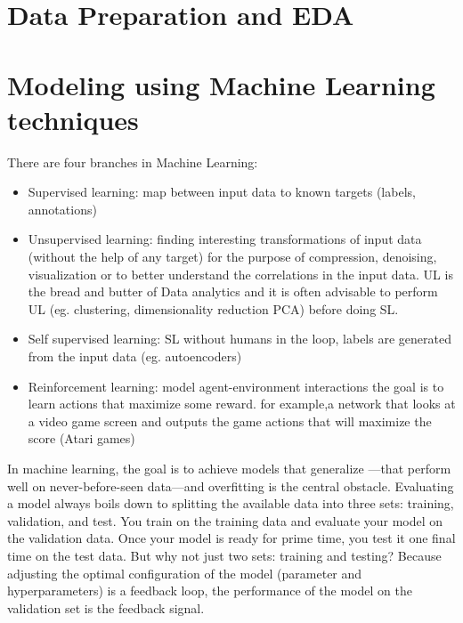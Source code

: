 \documentclass[11pt]{article}
\begin{document}
\section{Data Preparation and EDA} 
\label{se:eda}


\section{Modeling using Machine Learning techniques} 
\label{se:eda}

There are four branches in Machine Learning:  
\begin{itemize}
\item Supervised learning: map between input data to known targets (labels, annotations) 
\item Unsupervised learning: finding interesting transformations of input data (without the help of any target) for the purpose of compression, denoising, visualization or to better understand the correlations in the input data. UL is the bread and butter of Data analytics and it is often advisable to perform UL (eg. clustering, dimensionality reduction PCA) before doing SL. 
\item Self supervised learning: SL without humans in the loop, labels are generated from the input data (eg. autoencoders)
\item Reinforcement learning: model agent-environment interactions the goal is to learn actions that maximize some reward. for example,a network that looks at a video game screen and outputs the game actions that will maximize the score (Atari games)
\end{itemize}
In machine learning, the goal is to achieve models that generalize —that perform well on never-before-seen data—and overfitting is the central obstacle. Evaluating a model always boils down to splitting the available data into three sets: training, validation, and test. You train on the training data and evaluate your model on the validation data. Once your model is ready for prime time, you test it one final time on the test data. 
But why not just two sets: training and testing? Because adjusting the optimal configuration of the model (parameter and hyperparameters) is a feedback loop, the performance of the model on the validation set is the feedback signal.
\end{document}
